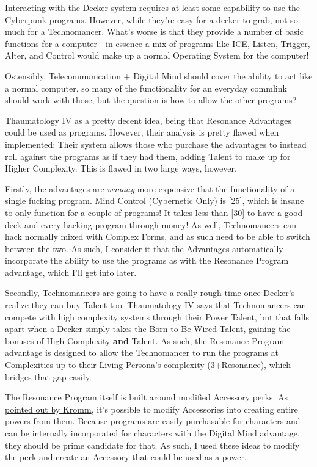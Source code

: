 \begin{multicols*}{2}
	Interacting with the Decker system requires at least some capability to use the Cyberpunk programs. However, while they're easy for a decker to grab, not so much for a Technomancer. What's worse is that they provide a number of basic functions for a computer - in essence a mix of programs like ICE, Listen, Trigger, Alter, and Control would make up a normal Operating System for the computer!
	
	Ostensibly, Telecommunication + Digital Mind should cover the ability to act like a normal computer, so many of the functionality for an everyday commlink should work with those, but the question is how to allow the other programs?
	
	Thaumatology IV as a pretty decent idea, being that Resonance Advantages could be used as programs. However, their analysis is pretty flawed when implemented: Their system allows those who purchase the advantages to instead roll against the programs as if they had them, adding Talent to make up for Higher Complexity. This is flawed in two large ways, however.
	
	Firstly, the advantages are \textit{waaaay} more expensive that the functionality of a single fucking program. Mind Control (Cybernetic Only) is [25], which is insane to only function for a couple of programs! It takes less than [30] to have a good deck and every hacking program through money! As well, Technomancers can hack normally mixed with Complex Forms, and as such need to be able to switch between the two. As such, I consider it that the Advantages automatically incorporate the ability to use the programs as with the Resonance Program advantage, which I'll get into later.
	
	Secondly, Technomancers are going to have a really rough time once Decker's realize they can buy Talent too. Thaumatology IV says that Technomancers can compete with high complexity systems through their Power Talent, but that falls apart when a Decker simply takes the Born to Be Wired Talent, gaining the bonuses of High Complexity \textbf{and} Talent. As such, the Resonance Program advantage is designed to allow the Technomancer to run the programs at Complexities up to their Living Persona's complexity (3+Resonance), which bridges that gap easily.
	
	The Resonance Program itself is built around modified Accessory perks. As \textcolor{NavyBlue}{\href{http://forums.sjgames.com/showpost.php?p=561052&postcount=8}{pointed out by Kromm}}, it's possible to modify Accessories into creating entire powers from them. Because programs are easily purchasable for characters and can be internally incorporated for characters with the Digital Mind advantage, they should be prime candidate for that. As such, I used these ideas to modify the perk and create an Accessory that could be used as a power.	
	

\end{multicols*}
